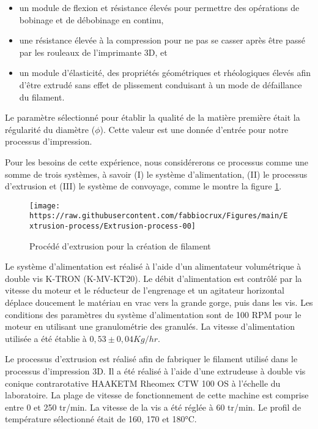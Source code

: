 \documentclass[
]{article}
\begin{document}
\begin{itemize}
\item
  un module de flexion et résistance élevés pour permettre des opérations de bobinage et de débobinage en continu,
\item
  une résistance élevée à la compression pour ne pas se casser après être passé par les rouleaux de l'imprimante 3D, et
\item
  un module d'élasticité, des propriétés géométriques et rhéologiques élevés afin d'être extrudé sans effet de plissement conduisant à un mode de défaillance du filament.
\end{itemize}

Le paramètre sélectionné pour établir la qualité de la matière première était la régularité du diamètre (\(\phi\)).
Cette valeur est une donnée d'entrée pour notre processus d'impression.

Pour les besoins de cette expérience, nous considérerons ce processus comme une somme de trois systèmes, à savoir (I) le système d'alimentation, (II) le processus d'extrusion et (III) le système de convoyage, comme le montre la figure \ref{fig:extrusion}.

\begin{figure}

{\centering \texttt{[image: https://raw.githubusercontent.com/fabbiocrux/Figures/main/Extrusion-process/Extrusion-process-00]} 

}

\caption{Procédé d’extrusion pour la création de filament }\label{fig:extrusion}
\end{figure}

Le système d'alimentation est réalisé à l'aide d'un alimentateur volumétrique à double vis K-TRON (K-MV-KT20). Le débit d'alimentation est contrôlé par la vitesse du moteur et le réducteur de l'engrenage et un agitateur horizontal déplace doucement le matériau en vrac vers la grande gorge, puis dans les vis.
Les conditions des paramètres du système d'alimentation sont de 100 RPM pour le moteur en utilisant une granulométrie des granulés.
La vitesse d'alimentation utilisée a été établie à \(0,53 ± 0,04 Kg/hr\).

Le processus d'extrusion est réalisé afin de fabriquer le filament utilisé dans le processus d'impression 3D. Il a été réalisé à l'aide d'une extrudeuse à double vis conique contrarotative HAAKETM Rheomex CTW 100 OS à l'échelle du laboratoire. La plage de vitesse de fonctionnement de cette machine est comprise entre 0 et 250 tr/min. La vitesse de la vis a été réglée à 60 tr/min. Le profil de température sélectionné était de 160, 170 et 180°C.
\end{document}

